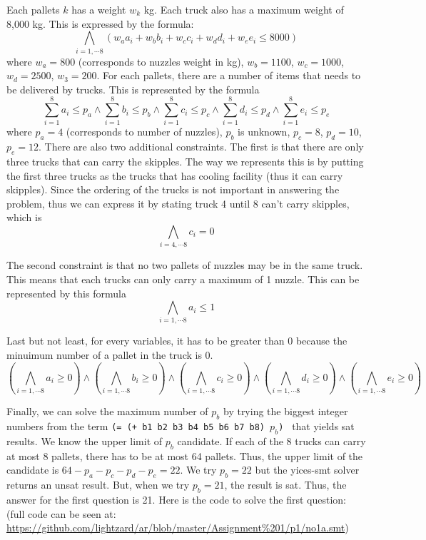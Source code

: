 \documentclass[12pt]{article}
\begin{document}
Each pallets $k$ has a weight $w_k$ kg. Each truck also has a maximum weight of 8,000 kg. This is expressed by the formula:
\[\bigwedge_{i=1,\cdots 8}{(w_a a_i + w_b b_i + w_c c_i + w_d d_i + w_e e_i \leq 8000)}  \]
where $w_a=800$ (corresponds to nuzzles weight in kg), $w_b=1100$, $w_c=1000$, $w_d=2500$, $w_3=200$. For each pallets, there are a number of items that needs to be delivered by trucks. This is represented by the formula
\[ \sum_{i=1}^{8}{a_i} \leq p_a \wedge
 \sum_{i=1}^{8}{b_i} \leq p_b \wedge 
 \sum_{i=1}^{8}{c_i} \leq p_c \wedge
 \sum_{i=1}^{8}{d_i} \leq p_d \wedge
 \sum_{i=1}^{8}{e_i} \leq p_e\]
 where $p_a=4$ (corresponds to number of nuzzles), $p_b$ is unknown, $p_c=8$, $p_d=10$, $p_e=12$. There are also two additional constraints. The first is that there are only three trucks that can carry the skipples. The way we represents this is by putting the first three trucks as the trucks that has cooling facility (thus it can carry skipples). Since the ordering of the trucks is not important in answering the problem, thus we can express it by stating truck 4 until 8 can't carry skipples, which is 
 \[ \bigwedge_{i=4,\cdots 8} c_i=0\]
 
 The second constraint is that no two pallets of nuzzles may be in the same truck. This means that each trucks can only carry a maximum of 1 nuzzle. This can be represented by this formula
 \[ \bigwedge_{i=1,\cdots 8} a_i\leq1\]
 
 Last but not least, for every variables, it has to be greater than 0 because the minuimum number of a pallet in the truck is 0.
 \[ (\bigwedge_{i=1,\cdots 8} a_i\geq0) \wedge (\bigwedge_{i=1,\cdots 8} b_i\geq0) \wedge (\bigwedge_{i=1,\cdots 8} c_i\geq0) \wedge  (\bigwedge_{i=1,\cdots 8} d_i\geq0) \wedge (\bigwedge_{i=1,\cdots 8} e_i\geq0)\]
 
 Finally, we can solve the maximum number of $p_b$ by trying the biggest integer numbers from the term {\tt (= (+ b1 b2 b3 b4 b5 b6 b7 b8) $p_b$) } that yields sat results. We know the upper limit of $p_b$ candidate. If each of the 8 trucks can carry at most 8 pallets, there has to be at most 64 pallets. Thus, the upper limit of the candidate is $64-p_a-p_c-p_d-p_e=22$. We try $p_b=22$ but the yices-smt solver returns an unsat result. But, when we try $p_b=21$, the result is sat. Thus, the answer for the first question is 21. Here is the code to solve the first question: (full code can be seen at: \url{https://github.com/lightzard/ar/blob/master/Assignment\%201/p1/no1a.smt})
 
\end{document}
